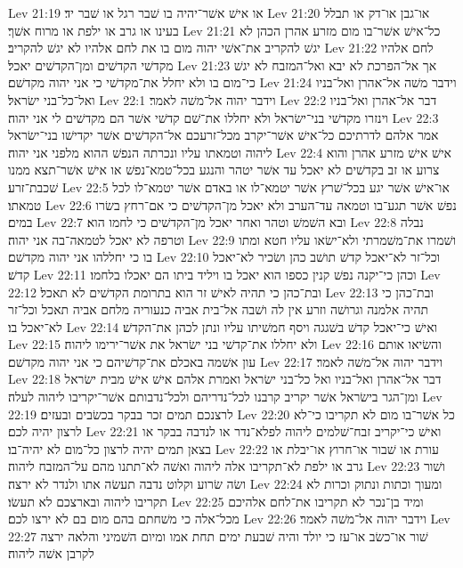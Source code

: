 Lev 21:19  או אישׁ אשׁר־יהיה בו שׁבר רגל או שׁבר יד׃
Lev 21:20  או־גבן או־דק או תבלל בעינו או גרב או ילפת או מרוח אשׁך׃
Lev 21:21  כל־אישׁ אשׁר־בו מום מזרע אהרן הכהן לא יגשׁ להקריב את־אשׁי יהוה מום בו את לחם אלהיו לא יגשׁ להקריב׃
Lev 21:22  לחם אלהיו מקדשׁי הקדשׁים ומן־הקדשׁים יאכל׃
Lev 21:23  אך אל־הפרכת לא יבא ואל־המזבח לא יגשׁ כי־מום בו ולא יחלל את־מקדשׁי כי אני יהוה מקדשׁם׃
Lev 21:24  וידבר משׁה אל־אהרן ואל־בניו ואל־כל־בני ישׂראל׃
Lev 22:1  וידבר יהוה אל־משׁה לאמר׃
Lev 22:2  דבר אל־אהרן ואל־בניו וינזרו מקדשׁי בני־ישׂראל ולא יחללו את־שׁם קדשׁי אשׁר הם מקדשׁים לי אני יהוה׃
Lev 22:3  אמר אלהם לדרתיכם כל־אישׁ אשׁר־יקרב מכל־זרעכם אל־הקדשׁים אשׁר יקדישׁו בני־ישׂראל ליהוה וטמאתו עליו ונכרתה הנפשׁ ההוא מלפני אני יהוה׃
Lev 22:4  אישׁ אישׁ מזרע אהרן והוא צרוע או זב בקדשׁים לא יאכל עד אשׁר יטהר והנגע בכל־טמא־נפשׁ או אישׁ אשׁר־תצא ממנו שׁכבת־זרע׃
Lev 22:5  או־אישׁ אשׁר יגע בכל־שׁרץ אשׁר יטמא־לו או באדם אשׁר יטמא־לו לכל טמאתו׃
Lev 22:6  נפשׁ אשׁר תגע־בו וטמאה עד־הערב ולא יאכל מן־הקדשׁים כי אם־רחץ בשׂרו במים׃
Lev 22:7  ובא השׁמשׁ וטהר ואחר יאכל מן־הקדשׁים כי לחמו הוא׃
Lev 22:8  נבלה וטרפה לא יאכל לטמאה־בה אני יהוה׃
Lev 22:9  ושׁמרו את־משׁמרתי ולא־ישׂאו עליו חטא ומתו בו כי יחללהו אני יהוה מקדשׁם׃
Lev 22:10  וכל־זר לא־יאכל קדשׁ תושׁב כהן ושׂכיר לא־יאכל קדשׁ׃
Lev 22:11  וכהן כי־יקנה נפשׁ קנין כספו הוא יאכל בו ויליד ביתו הם יאכלו בלחמו׃
Lev 22:12  ובת־כהן כי תהיה לאישׁ זר הוא בתרומת הקדשׁים לא תאכל׃
Lev 22:13  ובת־כהן כי תהיה אלמנה וגרושׁה וזרע אין לה ושׁבה אל־בית אביה כנעוריה מלחם אביה תאכל וכל־זר לא־יאכל בו׃
Lev 22:14  ואישׁ כי־יאכל קדשׁ בשׁגגה ויסף חמשׁיתו עליו ונתן לכהן את־הקדשׁ׃
Lev 22:15  ולא יחללו את־קדשׁי בני ישׂראל את אשׁר־ירימו ליהוה׃
Lev 22:16  והשׂיאו אותם עון אשׁמה באכלם את־קדשׁיהם כי אני יהוה מקדשׁם׃
Lev 22:17  וידבר יהוה אל־משׁה לאמר׃
Lev 22:18  דבר אל־אהרן ואל־בניו ואל כל־בני ישׂראל ואמרת אלהם אישׁ אישׁ מבית ישׂראל ומן־הגר בישׂראל אשׁר יקריב קרבנו לכל־נדריהם ולכל־נדבותם אשׁר־יקריבו ליהוה לעלה׃
Lev 22:19  לרצנכם תמים זכר בבקר בכשׂבים ובעזים׃
Lev 22:20  כל אשׁר־בו מום לא תקריבו כי־לא לרצון יהיה לכם׃
Lev 22:21  ואישׁ כי־יקריב זבח־שׁלמים ליהוה לפלא־נדר או לנדבה בבקר או בצאן תמים יהיה לרצון כל־מום לא יהיה־בו׃
Lev 22:22  עורת או שׁבור או־חרוץ או־יבלת או גרב או ילפת לא־תקריבו אלה ליהוה ואשׁה לא־תתנו מהם על־המזבח ליהוה׃
Lev 22:23  ושׁור ושׂה שׂרוע וקלוט נדבה תעשׂה אתו ולנדר לא ירצה׃
Lev 22:24  ומעוך וכתות ונתוק וכרות לא תקריבו ליהוה ובארצכם לא תעשׂו׃
Lev 22:25  ומיד בן־נכר לא תקריבו את־לחם אלהיכם מכל־אלה כי משׁחתם בהם מום בם לא ירצו לכם׃
Lev 22:26  וידבר יהוה אל־משׁה לאמר׃
Lev 22:27  שׁור או־כשׂב או־עז כי יולד והיה שׁבעת ימים תחת אמו ומיום השׁמיני והלאה ירצה לקרבן אשׁה ליהוה׃
